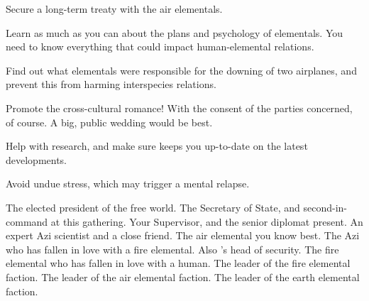 \documentclass[char]{elementals}
\begin{document}
\begin{itemz}[Goals]
	\item  Secure a long-term treaty with the air elementals.
	\item  Learn as much as you can about the plans and psychology of elementals.  You need to know everything that could impact human-elemental relations.
	\item  Find out what elementals were responsible for the downing of two airplanes, and prevent this from harming interspecies relations.
	\item  Promote the cross-cultural romance!  With the consent of the parties concerned, of course.  A big, public wedding would be best.
	\item  Help \cScientist{} with \cScientist{\their} research, and make sure \cScientist{\they} keeps you up-to-date on the latest developments.
	\item  Avoid undue stress, which may trigger a mental relapse.
\end{itemz}

\begin{contacts}
	\contact{\cLeader{}}  The elected president of the free world.
	\contact{\cDema{}}  The Secretary of State, and second-in-command at this gathering.
	\contact{\cAvatar{}}  Your Supervisor, and the senior diplomat present.
	\contact{\cScientist{}}  An expert Azi scientist and a close friend.
	\contact{\cNaturalist{}}  The air elemental you know best. 
	\contact{\cRomeo{}}  The Azi who has fallen in love with a fire elemental.  Also \cLeader{}'s head of security.
	\contact{\cJuliet{}}  The fire elemental who has fallen in love with a human.
        \contact{\cQueen{}}  The leader of the fire elemental faction.
        \contact{\cKing{}}  The leader of the air elemental faction.
        \contact{\cEarthKing{}}  The leader of the earth elemental faction.
\end{contacts}
\end{document}
